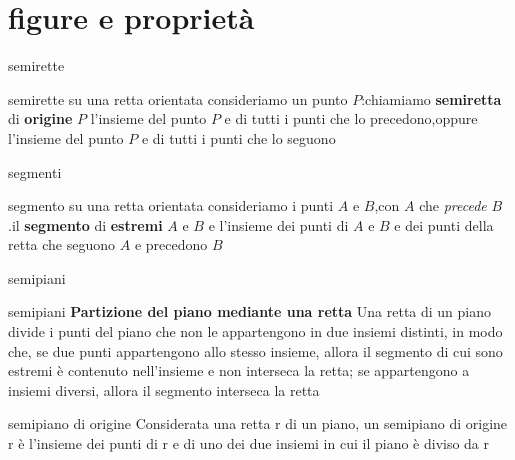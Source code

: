 \documentclass{beamer}
\newif\ifplacelogo %
\begin{document}
\section{figure e proprietà}
\placelogotrue
\begin{frame}{semirette}
    \begin{block}{semirette}
    su una retta orientata consideriamo un punto $P$:chiamiamo \textbf{semiretta} di \textbf{origine} $P$ l'insieme del punto $P$ e di tutti i punti che lo precedono,oppure l'insieme del punto $P$ e di tutti i punti che lo seguono
       \end{block}
      \hspace{2cm}
    \begin{center}
    \end{center}
\end{frame}
\begin{frame}{segmenti}
    \begin{block}{segmento}
    su una retta orientata consideriamo i punti $A$ e $B$,con $A$ che \emph{precede} $B$.il \textbf{segmento} di \textbf{estremi} $A$ e $B$ e l'insieme dei punti di $A$ e $B$ e dei punti della retta che seguono $A$
 e precedono $B$
\end{block}
\end{frame}
\begin{frame}{semipiani}
\begin{block}{semipiani}
   \textbf{Partizione del piano mediante una retta}  Una retta di un piano divide i punti del piano che non le appartengono in due insiemi distinti, in modo che, se due punti appartengono allo stesso insieme, allora il segmento di cui sono estremi è contenuto nell’insieme e non interseca la retta; se appartengono a insiemi diversi, allora il segmento interseca la retta
\end{block}
\begin{block}{semipiano di origine}
   Considerata una retta r di un piano, un semipiano di origine r è l’insieme dei punti di r e di uno dei due insiemi in cui il piano è diviso da r
\end{block}
\end{frame}
\end{document}
